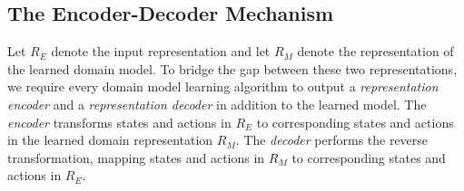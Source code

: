 


\subsection{The Encoder-Decoder Mechanism}
Let $R_E$ denote the input representation and let $R_M$ denote the representation of the learned domain model. 
To bridge the gap between these two representations, we require every domain model learning algorithm to output 
a \emph{representation encoder} and a \emph{representation decoder} in addition to the learned model. 
The \emph{encoder} transforms states and actions in $R_E$ to corresponding states and actions in the learned domain representation $R_M$. 
The \emph{decoder} performs the reverse transformation, mapping states and actions in $R_M$ to corresponding states and actions in $R_E$.


